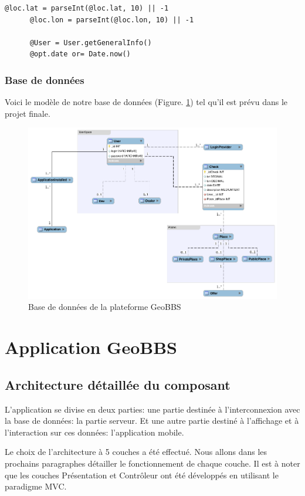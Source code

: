 \documentclass[a4paper,12pt]{report}
\begin{document}
\begin{onehalfspace}
\begin{lstlisting}[float=htb, frame=lines, caption={Model Check}, label={code:modelCheck}]
      @loc.lat = parseInt(@loc.lat, 10) || -1
      @loc.lon = parseInt(@loc.lon, 10) || -1

      @User = User.getGeneralInfo()
      @opt.date or= Date.now()
\end{lstlisting}


\subsection{Base de données}
Voici le modèle de notre base de données (Figure. \ref{fig:amqp1}) tel qu'il est prévu dans le projet finale.

\begin{figure}[htb]
  \centering
  \includegraphics[width=\textwidth]{diagrameBDD/model.png}
  \caption{Base de données de la plateforme GeoBBS}
  \label{fig:amqp1}
\end{figure}

\chapter{Application GeoBBS}
\section{Architecture détaillée du composant}
L'application se divise en deux parties: une partie destinée à l'interconnexion avec la base de données: la partie serveur. Et une autre partie destiné à l'affichage et à l'interaction sur ces données: l'application mobile.

Le choix de l’architecture à 5 couches a été effectué. Nous allons dans les prochains paragraphes détailler le fonctionnement de chaque couche. Il est à noter que les couches Présentation et Contrôleur ont été développés en utilisant le paradigme MVC.



\end{onehalfspace}
\end{document}
